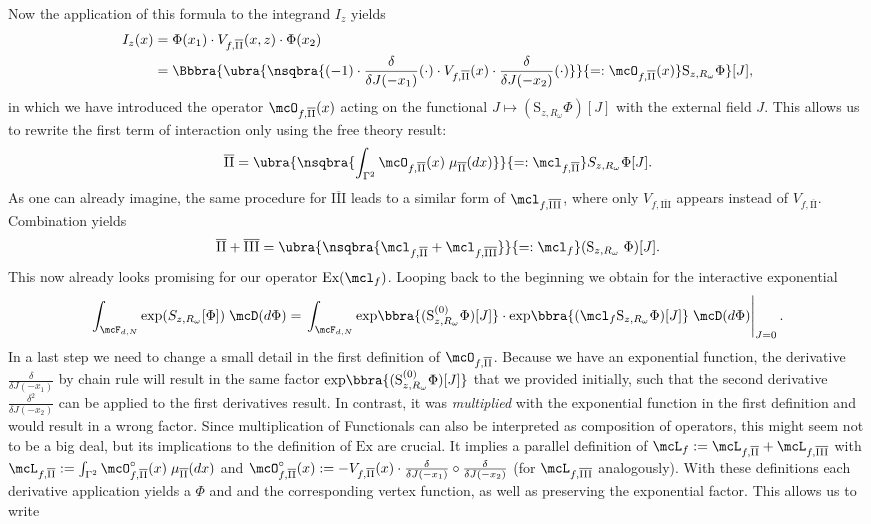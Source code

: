 Now the application of this formula to the integrand $I_z$ yields
\begin{align*}
    I_z(x) &= \Phi(x_1)\cdot V_{f,\overline{\text{II}}}(x,z)\cdot\Phi(x_2) \\
    &= \Bbbra{\ubra{\nsqbra{
        (-1)\cdot\frac{\delta}{\delta J(-x_1)}(\cdot)\cdot V_{f,\overline{\text{II}}}(x)\cdot\frac{\delta}{\delta J(-x_2)}(\cdot)
    }}{=:\mcO_{f,\overline{\text{II}}}(x)}
    \text{S}_{z,R_\omega}\Phi}[J],
\end{align*}
    in which we have introduced the operator $\mcO_{f,\overline{\text{II}}}(x)$ acting on the functional $J\mapsto (\text{S}_{z,R_\omega}\Phi)[J]$ with the external field $J$. This allows us to rewrite the first term of interaction only using the free theory result:
\[
    \overline{\text{II}} = \ubra{\nsqbra{
        \int_{\Gamma^2}\mcO_{f,\overline{\text{II}}}(x)\;\mu_{\overline{\text{II}}}(dx)
    }}{=:\mcl_{f,\overline{\text{II}}}}S_{z,R_\omega}\Phi[J].
\]
As one can already imagine, the same procedure for $\overline{\text{III}}$ leads to a similar form of $\mcl_{f,\overline{\text{III}}}$, where only $V_{f,\overline{\text{III}}}$ appears instead of $V_{f,\overline{\text{II}}}$. Combination yields
\[
    \overline{\text{II}} + \overline{\text{III}} = \ubra{\nsqbra{\mcl_{f,\overline{\text{II}}} + \mcl_{f,\overline{\text{III}}}}}{=:\mcl_f}(\text{S}_{z,R_\omega}\;\Phi)[J].
\]
This now already looks promising for our operator $\text{Ex}(\mcl_f)$. Looping back to the beginning we obtain for the interactive exponential
\[
    \int_{\mcF_{d,N}}\exp(S_{z,R_\omega}[\Phi])\;\mcD(d\Phi) = \left.\int_{\mcF_{d,N}}{\exp}\bbra{(\text{S}_{z,R_\omega}^{(0)}\Phi)[J]}\cdot{\exp}\bbra{(\mcl_f\text{S}_{z,R_\omega}\Phi)[J]}\;\mcD(d\Phi)\right|_{J=0}.
\]
In a last step we need to change a small detail in the first definition of $\mcO_{f,\overline{\text{II}}}$. Because we have an exponential function, the derivative $\frac{\delta}{\delta J(-x_1)}$ by chain rule will result in the same factor ${\exp}\bbra{(\text{S}_{z,R_\omega}^{(0)}\Phi)[J]}$ that we provided initially, such that the second derivative $\frac{\delta^2}{\delta J(-x_2)}$ can be applied to the first derivatives result. In contrast, it was \emph{multiplied} with the exponential function in the first definition and would result in a wrong factor. Since multiplication of Functionals can also be interpreted as composition of operators, this might seem not to be a big deal, but its implications to the definition of $\text{Ex}$ are crucial. It implies a parallel definition of $\mcL_f:=\mcL_{f,\overline{\text{II}}} + \mcL_{f,\overline{\text{III}}}$ with $\mcL_{f,\overline{\text{II}}}:=\int_{\Gamma^2}\mcO^\circ_{f,\overline{\text{II}}}(x)\;\mu_{\overline{\text{II}}}(dx)$ and $\mcO^\circ_{f,\overline{\text{II}}}(x) := -V_{f,\overline{\text{II}}}(x)\cdot\frac{\delta}{\delta J(-x_1)}\circ\frac{\delta}{\delta J(-x_2)}$ (for $\mcL_{f,\overline{\text{III}}}$ analogously). With these definitions each derivative application yields a $\Phi$ and and the corresponding vertex function, as well as preserving the exponential factor. This allows us to write
